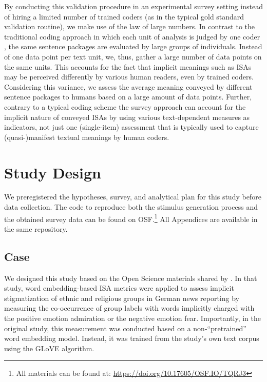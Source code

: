 By conducting this validation procedure in an experimental survey setting instead of hiring a limited number of trained coders (as in the typical gold standard validation routine), we make use of the law of large numbers. In contrast to the traditional coding approach in which each unit of analysis is judged by one coder \parencite[also the one applied in crowd coding, see, e.g.,][]{atteveldt:2021:VSA,lind:2017:CAC}, the same sentence packages are evaluated by large groups of individuals. Instead of one data point per text unit, we, thus, gather a large number of data points on the same units. This accounts for the fact that implicit meanings such as ISAs may be perceived differently by various human readers, even by trained coders. Considering this variance, we assess the average meaning conveyed by different sentence packages to humans based on a large amount of data points. Further, contrary to a typical coding scheme the survey approach can account for the implicit nature of conveyed ISAs by using various text-dependent measures as indicators, not just one (single-item) assessment that is typically used to capture (quasi-)manifest textual meanings by human coders.

\section{Study Design}

We preregistered the hypotheses, survey, and analytical plan for this study before data collection. The code to reproduce both the stimulus generation process and the obtained survey data can be found on OSF.\footnote{All materials can be found at: \url{https://doi.org/10.17605/OSF.IO/TQRJ3}} All Appendices are available in the same repository. 

\subsection{Case}

We designed this study based on the Open Science materials shared by \textcite{mueller:2023:DRN}. In that study, word embedding-based ISA metrics were applied to assess implicit stigmatization of ethnic and religious groups in German news reporting by measuring the co-occurrence of group labels with words implicitly charged with the positive emotion admiration or the negative emotion fear. Importantly, in the original study, this measurement was conducted based on a non-``pretrained'' word embedding model. Instead, it was trained from the study's own text corpus using the GLoVE algorithm.

